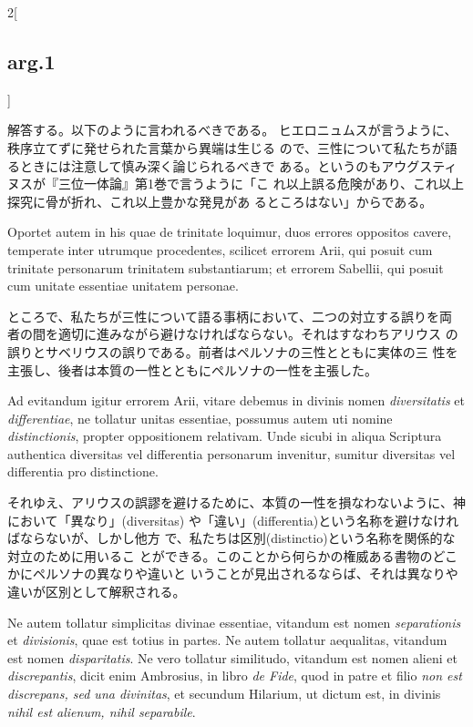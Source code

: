 \documentclass[paper=a4paper,fontsize=10pt,jafontsize=9pt,titlepage]{jlreq}
\begin{document}
\begin{paracol}{2}[\subsection{arg.1}]
\switchcolumn

解答する。以下のように言われるべきである。
ヒエロニュムスが言うように、秩序立てずに発せられた言葉から異端は生じる
ので、三性について私たちが語るときには注意して慎み深く論じられるべきで
 ある。というのもアウグスティヌスが『三位一体論』第1巻で言うように「こ
 れ以上誤る危険があり、これ以上探究に骨が折れ、これ以上豊かな発見があ
 るところはない」からである。

\switchcolumn*

Oportet autem in his
quae de trinitate loquimur, duos errores oppositos cavere, temperate
inter utrumque procedentes, scilicet errorem Arii, qui posuit cum
trinitate personarum trinitatem substantiarum; et errorem Sabellii,
qui posuit cum unitate essentiae unitatem personae.

\switchcolumn

ところで、私たちが三性について語る事柄において、二つの対立する誤りを両
 者の間を適切に進みながら避けなければならない。それはすなわちアリウス
 の誤りとサベリウスの誤りである。前者はペルソナの三性とともに実体の三
 性を主張し、後者は本質の一性とともにペルソナの一性を主張した。

\switchcolumn*

Ad evitandum
igitur errorem Arii, vitare debemus in divinis nomen {\itshape diversitatis} et
{\itshape differentiae}, ne tollatur unitas essentiae, possumus autem uti nomine
{\itshape distinctionis}, propter oppositionem relativam. Unde sicubi in aliqua
Scriptura authentica diversitas vel differentia personarum invenitur,
sumitur diversitas vel differentia pro distinctione.

\switchcolumn

それゆえ、アリウスの誤謬を避けるために、本質の一性を損なわないように、神において「異なり」(diversitas)
や「違い」(differentia)という名称を避けなければならないが、しかし他方
 で、私たちは区別(distinctio)という名称を関係的な対立のために用いるこ
 とができる。このことから何らかの権威ある書物のどこかにペルソナの異なりや違いと
 いうことが見出されるならば、それは異なりや違いが区別として解釈される。

\switchcolumn*

Ne autem tollatur
simplicitas divinae essentiae, vitandum est nomen {\itshape separationis} et
{\itshape divisionis}, quae est totius in partes. Ne autem tollatur aequalitas,
vitandum est nomen {\itshape disparitatis}. Ne vero tollatur similitudo, vitandum
est nomen alieni et {\itshape discrepantis}, dicit enim Ambrosius, in libro {\itshape de
Fide}, quod in patre et filio {\itshape non est discrepans, sed una divinitas}, et
secundum Hilarium, ut dictum est, in divinis {\itshape nihil est alienum, nihil
separabile}.


\end{paracol}
\end{document}
